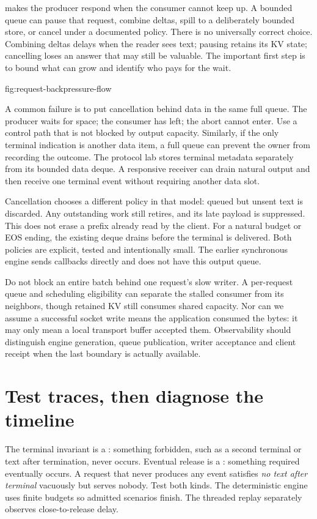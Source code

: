  makes the producer respond when the consumer cannot
keep up. A bounded queue can pause that request, combine deltas, spill to
a deliberately bounded store, or cancel under a documented policy.
There is no universally correct choice. Combining deltas delays when the
reader sees text; pausing retains its KV state; cancelling loses an answer
that may still be valuable. The important first step is to bound what can
grow and identify who pays for the wait.

{fig:request-backpressure-flow}

A common failure is to put cancellation behind data in the same full queue.
The producer waits for space; the consumer has left; the abort cannot enter.
Use a control path that is not blocked by output capacity. Similarly, if
the only terminal indication is another data item, a full queue can prevent
the owner from recording the outcome. The protocol lab stores terminal
metadata separately from its bounded data deque. A responsive receiver can
drain natural output and then receive one terminal event without requiring
another data slot.

Cancellation chooses a different policy in that model: queued but unsent
text is discarded. Any outstanding work still retires, and its late payload
is suppressed. This does not erase a prefix already read by the client.
For a natural budget or EOS ending, the existing deque drains before the
terminal is delivered. Both policies are explicit, tested and intentionally
small. The earlier synchronous engine sends callbacks directly and does not
have this output queue.

Do not block an entire batch behind one request's slow writer. A per-request
queue and scheduling eligibility can separate the stalled consumer from
its neighbors, though retained KV still consumes shared capacity. Nor can
we assume a successful socket write means the application consumed the
bytes: it may only mean a local transport buffer accepted them. Observability
should distinguish engine generation, queue publication, writer acceptance
and client receipt when the last boundary is actually available.

\section{Test traces, then diagnose the timeline}
The terminal invariant is a : something forbidden,
such as a second terminal or text after termination, never occurs.
Eventual release is a : something required
eventually occurs. A request that never produces any event satisfies
\emph{no text after terminal} vacuously but serves nobody. Test both kinds.
The deterministic engine uses finite budgets so admitted scenarios finish.
The threaded replay separately observes close-to-release delay.

